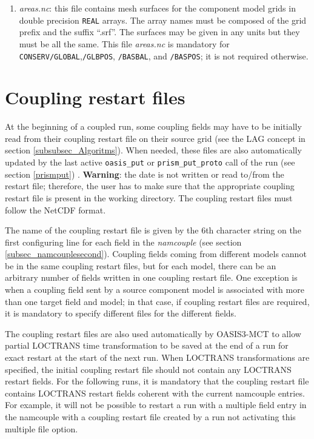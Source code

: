 \begin{enumerate}
\item {\em areas.nc}: this file contains mesh surfaces for the
  component model grids in double precision {\tt REAL} arrays. The
  array names must be composed of the grid prefix and the suffix
  ``.srf''.  The surfaces may be given in any units but they must be
  all the same. This file {\em areas.nc} is mandatory for {\tt
    CONSERV/GLOBAL},{\tt /GLBPOS}, {\tt /BASBAL}, and {\tt /BASPOS};
  it is not required otherwise.

\end{enumerate}

\section{Coupling restart files}
\label{subsec_restartdata}

At the beginning of a coupled run, some coupling fields may have to be
initially read from their coupling restart file on their source grid
(see the LAG concept in section \ref{subsubsec_Algoritms}). When
needed, these files are also automatically updated by the last active
{\tt oasis\_put} or {\tt prism\_put\_proto} call of the run (see
section \ref{prismput}) .
{\bf Warning}: the date is not written or read to/from the restart
file; therefore, the user has to make sure that the appropriate
coupling restart file is present in the working directory. The
coupling restart files must follow the NetCDF format.


The name of the coupling restart file is given by the 6th character
string on the first configuring line for each field in the {\it
  namcouple} (see section \ref{subsec_namcouplesecond}). Coupling
fields coming from different models cannot be in the same coupling
restart files, but for each model, there can be an arbitrary number of
fields written in one coupling restart file. One exception is when a coupling field sent by a source component model is associated with more than one target field and model; in that case, if coupling restart files are required, it is mandatory to specify different files for the different fields. 

The coupling restart files are also used automatically by OASIS3-MCT
to allow partial LOCTRANS time transformation to be saved at the end
of a run for exact restart at the start of the next run.  When
LOCTRANS transformations are specified, the initial coupling restart
file should not contain any LOCTRANS restart fields. For the following
runs, it is mandatory that the coupling restart file contains LOCTRANS
restart fields coherent with the current namcouple entries. For
example, it will not be possible to restart a run with a multiple
field entry in the namcouple with a coupling restart file created by a
run not activating this multiple file option.

